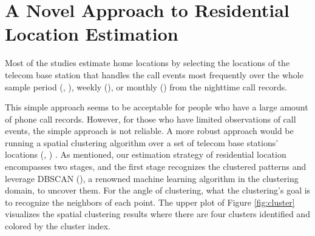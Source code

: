\section{A Novel Approach to Residential Location Estimation}


Most of the studies estimate home locations by selecting the locations of the telecom base station that handles the call events most frequently over the whole sample period (\cite{cho2011friendship}, \cite{phithakkitnukoon2012socio}), weekly (\cite{referral_effect_2023aer}), or monthly (\cite{phithakkitnukoon2022inferring}) from the nighttime call records.




This simple approach seems to be acceptable for people who have a large amount of phone call records. However, for those who have limited observations of call events, the simple approach is not reliable. A more robust approach would be running a spatial clustering algorithm over a set of telecom base stations' locations (\cite{isaacman2011identifying}, \cite{yang2014identifying}) . As mentioned, our estimation strategy of residential location encompasses two stages, and the first stage recognizes the clustered patterns and leverage DBSCAN (\cite{ester1996density}), a renowned machine learning algorithm in the clustering domain, to uncover them. For the angle of clustering, what the clustering's goal is to recognize the neighbors of each point. The upper plot of Figure \ref{fig:cluster} visualizes the spatial clustering results where there are four clusters identified and colored by the cluster index.


